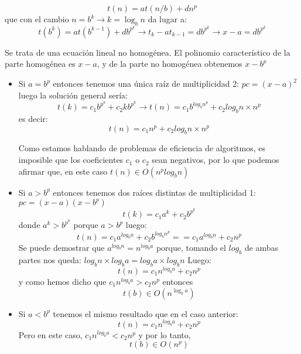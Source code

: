 \documentclass[a4paper, 11pt]{article}
\begin{document}
$$t(n)=a t(n/b) + d n^p$$ que con el cambio $n=b^k\rightarrow k= \log_bn$ da lugar a:
$$t(b^k)=at(b^{k-1})+db^{p^k} \rightarrow t_k-at_{k-1}=db^{p^k} \rightarrow x-a = db^{p^k}$$

Se trata de una ecuación lineal no homogénea. El polinomio característico de la parte homogénea es $x-a$, y de la parte no homogénea obtenemos $x-b^p$ 

\begin{itemize}
	\item Si $a=b^p$ entonces tenemos una única raíz de multiplicidad 2: $pc=(x-a)^2$ luego la solución general sería: 
	$$ t(k) = c_1 b^{p^k} + c_2 k b^{p^k} \rightarrow t(n) = c_1b^{log_bn^p}+c_2log_bn \times n^p $$ es decir:
	$$ t(n) = c_1n^p + c_2log_bn \times n^p$$
	
	Como estamos hablando de problemas de eficiencia de algoritmos, es imposible que los coeficientes $c_1$ o $c_2$ sean negativos, por lo que podemos afirmar que, en este caso $t(n)\in O(n^plog_bn)$ 
	\item Si $a>b^p$ entonces tenemos dos raíces distintas de multiplicidad 1: $pc=(x-a)(x-b^p)$ 
	$$t(k)= c_1a^k + c_2b^{p^k} $$ donde $a^k > b^{p^k} $ porque $a>b^p$ luego:
	$$t(n) = c_1a^{log_bn}+c_2b^{{log_bn}^p}==c_1a^{log_bn}+c_2n^p$$
	Se puede demostrar que $a^{log_bn}=n^{log_ba}$ porque, tomando el $log_b$ de ambas partes nos queda: $log_bn \times log_ba = log_ba \times log_bn$ Luego:
	$$t(n)=c_1n^{log_ba}+c_2n^p$$ y como hemos dicho que $c_1n^{log_ba} > c_2n^p$ entonces $$t(b) \in O(n^{\log_ba})$$
	\item Si $a<b^p$ tenemos el mismo resultado que en el caso anterior: 
	$$t(n)=c_1n^{log_ba}+c_2n^p$$ Pero en este caso, $c_1n^{log_ba} < c_2n^p$ y por lo tanto, $$t(b) \in O(n^p)$$
	
\end{itemize}
\end{document}
